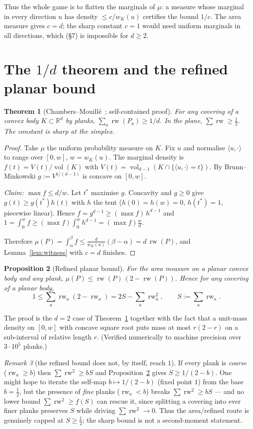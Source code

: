 \documentclass[11pt]{article}
\theoremstyle{plain}
\newtheorem{theorem}{Theorem}
\newtheorem{proposition}[theorem]{Proposition}
\theoremstyle{remark}
\newtheorem{remark}[theorem]{Remark}
\newcommand{\rw}{\operatorname{rw}}
\newcommand{\R}{\mathbb{R}}
\DeclareMathOperator{\vol}{vol}
\begin{document}
Thus the whole game is to flatten the marginals of $\mu$: a measure whose
marginal in every direction $u$ has density $\le c/w_K(u)$ certifies the bound
$1/c$. The area measure gives $c=d$; the sharp constant $c=1$ would need uniform
marginals in all directions, which (\S7) is impossible for $d\ge2$.

\section{The $1/d$ theorem and the refined planar bound}

\begin{theorem}[Chambers--Mouill\'e~\cite{chambers2016}; self-contained proof]
\label{thm:oned}
For any covering of a convex body $K\subset\R^d$ by planks,
$\sum_a\rw(P_a)\ge 1/d$. In the plane, $\sum\rw\ge\tfrac12$. The constant is
sharp at the simplex.
\end{theorem}
\begin{proof}
Take $\mu$ the uniform probability measure on $K$. Fix $u$ and normalise
$\langle u,\cdot\rangle$ to range over $[0,w]$, $w=w_K(u)$. The marginal density
is $f(t)=V(t)/\vol(K)$ with $V(t)=\vol_{d-1}(K\cap\{\langle u,\cdot\rangle=t\})$.
By Brunn--Minkowski $g:=V^{1/(d-1)}$ is concave on $[0,w]$.

\emph{Claim: $\max f\le d/w$.} Let $t^\ast$ maximise $g$. Concavity and $g\ge0$
give $g(t)\ge g(t^\ast)h(t)$ with $h$ the tent ($h(0)=h(w)=0$, $h(t^\ast)=1$,
piecewise linear). Hence $f=g^{d-1}\ge(\max f)\,h^{d-1}$ and
$1=\int_0^w f\ge(\max f)\int_0^w h^{d-1}=(\max f)\tfrac{w}{d}$.

Therefore $\mu(P)=\int_\alpha^\beta f\le \tfrac{d}{w_K(u)}(\beta-\alpha)
=d\,\rw(P)$, and Lemma~\ref{lem:witness} with $c=d$ finishes.
\end{proof}

\begin{proposition}[Refined planar bound]\label{prop:refined}
For the area measure on a planar convex body and any plank,
$\mu(P)\le\rw(P)\,(2-\rw(P))$. Hence for any covering of a planar body,
\[
  1\le \sum_a \rw_a(2-\rw_a)=2S-\sum_a\rw_a^2,\qquad S:=\sum_a\rw_a .
\]
\end{proposition}
The proof is the $d=2$ case of Theorem~\ref{thm:oned} together with the fact
that a unit-mass density on $[0,w]$ with concave square root puts mass at most
$r(2-r)$ on a sub-interval of relative length $r$. (Verified numerically to
machine precision over $3\cdot10^5$ planks.)

\begin{remark}[the refined bound does not, by itself, reach $1$]
If every plank is \emph{coarse} ($\rw_a\ge b$) then $\sum\rw^2\ge bS$ and
Proposition~\ref{prop:refined} gives $S\ge 1/(2-b)$. One might hope to iterate the
self-map $b\mapsto1/(2-b)$ (fixed point $1$) from the base $b=\tfrac12$, but the
presence of \emph{fine} planks ($\rw_a<b$) breaks $\sum\rw^2\ge bS$ — and no lower
bound $\sum\rw^2\ge f(S)$ can rescue it, since splitting a covering into ever finer
planks preserves $S$ while driving $\sum\rw^2\to0$. Thus the area/refined route is
genuinely capped at $S\ge\tfrac12$; the sharp bound is not a second-moment statement.
\end{remark}
\end{document}
